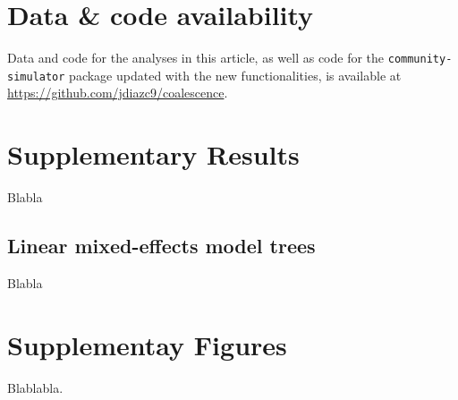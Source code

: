 \documentclass[a4paper,10pt]{article}
\begin{document}
\clearpage

\section{Data \& code availability}
\label{supp-datacode}

Data and code for the analyses in this article, as well as code for the
\texttt{community-simulator} package updated with the new functionalities,
is available at \url{https://github.com/jdiazc9/coalescence}.

\clearpage

\section{Supplementary Results}\label{supp-results}

Blabla

\subsection{Linear mixed-effects model trees}
\label{suppl-linear-mixed-model-results}

Blabla

\clearpage

\section{Supplementay Figures}\label{supp-figs}

Blablabla.

\clearpage

{\small
  
% 

}
\end{document}
